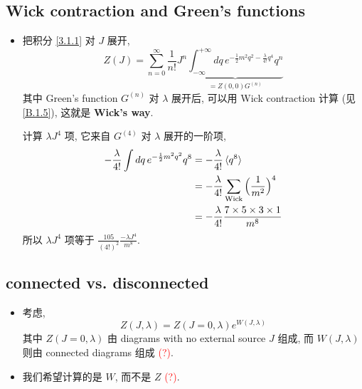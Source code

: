 \subsection{Wick contraction and Green's functions}
\begin{itemize}
	\item 把积分 \eqref{3.1.1} 对 $J$ 展开,
	\begin{equation}
		Z(J) = \sum_{n = 0}^\infty \frac{1}{n!} J^n \underbrace{\int_{- \infty}^{+ \infty} dq \, e^{- \frac{1}{2} m^2 q^2 - \frac{\lambda}{4!} q^4} q^n}_{= Z(0, 0) G^{(n)}}
	\end{equation}
	其中 Green's function $G^{(n)}$ 对 $\lambda$ 展开后, 可以用 Wick contraction 计算 (见 \eqref{B.1.5}), 这就是 \textbf{Wick's way}.
	
	\begin{tcolorbox}[title=calculation:]
		计算 $\lambda J^4$ 项, 它来自 $G^{(4)}$ 对 $\lambda$ 展开的一阶项,
		\begin{align}
			- \frac{\lambda}{4!} \int dq \, e^{- \frac{1}{2} m^2 q^2} q^8 &= - \frac{\lambda}{4!} \braket{q^8} \notag \\
			&= - \frac{\lambda}{4!} \sum_{\text{Wick}} \Big( \frac{1}{m^2} \Big)^4 \notag \\
			&= - \frac{\lambda}{4!} \frac{7 \times 5 \times 3 \times 1}{m^8} \label{3.1.5}
		\end{align}
		所以 $\lambda J^4$ 项等于 $\frac{105}{(4!)^2} \frac{- \lambda J^4}{m^8}$.
	\end{tcolorbox}
\end{itemize}

\subsection{connected vs. disconnected}
\begin{itemize}
	\item 考虑,
	\begin{equation}
		Z(J, \lambda) = Z(J = 0, \lambda) e^{W(J, \lambda)}
	\end{equation}
	其中 $Z(J = 0, \lambda)$ 由 diagrams with no external source $J$ 组成, 而 $W(J, \lambda)$ 则由 connected diagrams 组成 \textcolor{red}{(?)}.
	
	\item 我们希望计算的是 $W$, 而不是 $Z$ \textcolor{red}{(?)}.
\end{itemize}

